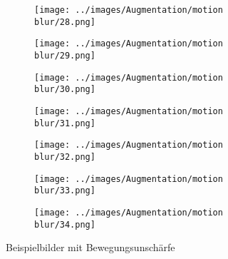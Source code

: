 \begin{figure}[H]
\begin{subfigure}[b]{0.1\textwidth}
 \centering
 \texttt{[image: ../images/Augmentation/motion blur/28.png]}
\end{subfigure}
\hspace{1em}%
\begin{subfigure}[b]{0.1\textwidth}
\centering
\texttt{[image: ../images/Augmentation/motion blur/29.png]}
\end{subfigure}
\hspace{1em}%
\begin{subfigure}[b]{0.1\textwidth}
\centering
\texttt{[image: ../images/Augmentation/motion blur/30.png]}
\end{subfigure}
\hspace{1em}%
\begin{subfigure}[b]{0.1\textwidth}
\centering
\texttt{[image: ../images/Augmentation/motion blur/31.png]}
\end{subfigure}
\hspace{1em}%
\begin{subfigure}[b]{0.1\textwidth}
\centering
\texttt{[image: ../images/Augmentation/motion blur/32.png]}
\end{subfigure}
\hspace{1em}%
\begin{subfigure}[b]{0.1\textwidth}
\centering
\texttt{[image: ../images/Augmentation/motion blur/33.png]}
\end{subfigure}
\hspace{1em}%
\begin{subfigure}[b]{0.1\textwidth}
\centering
\texttt{[image: ../images/Augmentation/motion blur/34.png]}
\end{subfigure}
\caption{Beispielbilder mit Bewegungsunschärfe}
\label{fig:motion-blur-imgs}
\end{figure}

